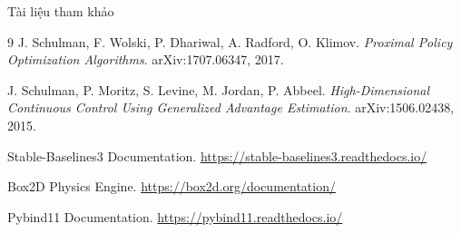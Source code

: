 \documentclass[aspectratio=169, 11pt]{beamer}
\begin{document}
\begin{frame}{Tài liệu tham khảo}
  \small
  \begin{thebibliography}{9}
     J. Schulman, F. Wolski, P. Dhariwal, A. Radford, O. Klimov.
    \textit{Proximal Policy Optimization Algorithms}.
    arXiv:1707.06347, 2017.

     J. Schulman, P. Moritz, S. Levine, M. Jordan, P. Abbeel.
    \textit{High-Dimensional Continuous Control Using Generalized Advantage Estimation}.
    arXiv:1506.02438, 2015.

     Stable-Baselines3 Documentation.
    \url{https://stable-baselines3.readthedocs.io/}

     Box2D Physics Engine.
    \url{https://box2d.org/documentation/}

     Pybind11 Documentation.
    \url{https://pybind11.readthedocs.io/}
  \end{thebibliography}
\end{frame}
\end{document}
